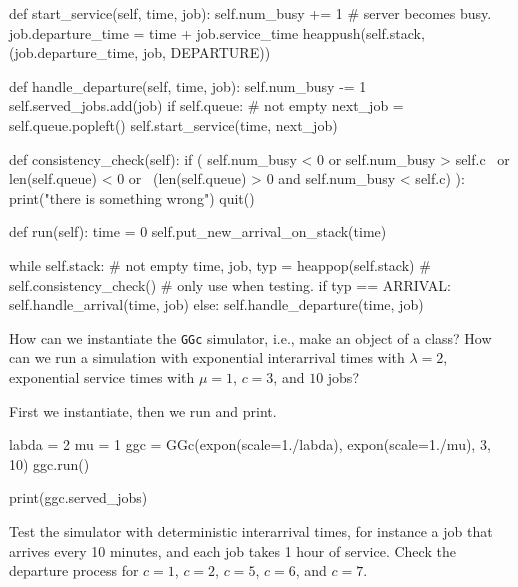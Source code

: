 \documentclass{scrartcl}
\begin{document}
\begin{exercise}
\begin{solution}
\begin{pyblock}
    def start_service(self, time, job):
        self.num_busy += 1  # server becomes busy.
        job.departure_time = time + job.service_time
        heappush(self.stack, (job.departure_time, job, DEPARTURE))

    def handle_departure(self, time, job):
        self.num_busy -= 1
        self.served_jobs.add(job)
        if self.queue:  # not empty
            next_job = self.queue.popleft()
            self.start_service(time, next_job)

    def consistency_check(self):
        if ( self.num_busy < 0 or self.num_busy > self.c \
            or len(self.queue) < 0 or \
            (len(self.queue) > 0 and self.num_busy < self.c) ):
            print("there is something wrong")
            quit()

    def run(self):
        time = 0
        self.put_new_arrival_on_stack(time)

        while self.stack:  # not empty
            time, job, typ = heappop(self.stack)
            # self.consistency_check() # only use when testing.
            if typ == ARRIVAL:
                self.handle_arrival(time, job)
            else:
                self.handle_departure(time, job)


\end{pyblock}
\end{solution}
  
\end{exercise}

      

\begin{exercise}

How can we instantiate the \texttt{GGc} simulator, i.e., make an object of a class? How can we run a simulation with exponential interarrival times with $\lambda=2$, exponential service times with $\mu=1$, $c=3$, and $10$ jobs?
\begin{solution}
First we instantiate, then we run and print. 
\begin{pyblock}
labda = 2
mu = 1  
ggc = GGc(expon(scale=1./labda), expon(scale=1./mu), 3, 10)
ggc.run()

print(ggc.served_jobs)
\end{pyblock}
\end{solution}
\end{exercise}

\begin{exercise}
Test the simulator with deterministic interarrival times, for instance a job that arrives every 10 minutes, and each job takes 1 hour of service. Check the departure process for $c=1$, $c=2$, $c=5$, $c=6$, and $c=7$. 
\end{exercise}
\end{document}
